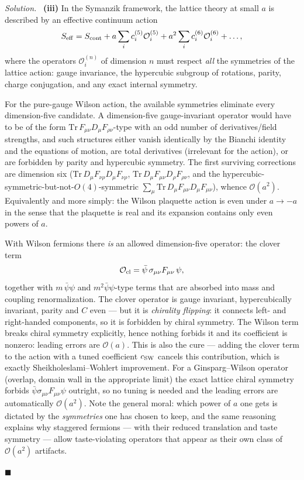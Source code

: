 \documentclass[11pt]{article}
\newenvironment{solution}{\par\smallskip\noindent\textit{Solution.}\ }{\hfill$\blacksquare$\par\smallskip}
\begin{document}
\begin{solution}
\textbf{(iii)} In the Symanzik framework, the lattice theory at small $a$ is described by an effective continuum action
\begin{equation}
S_{\rm eff} = S_{\rm cont} + a\sum_i c_i^{(5)} \mathcal{O}_i^{(5)} + a^2 \sum_i c_i^{(6)} \mathcal{O}_i^{(6)} + \dots,
\end{equation}
where the operators $\mathcal{O}_i^{(n)}$ of dimension $n$ must respect \emph{all} the symmetries of the lattice action: gauge invariance, the hypercubic subgroup of rotations, parity, charge conjugation, and any exact internal symmetry.

For the pure-gauge Wilson action, the available symmetries eliminate every dimension-five candidate. A dimension-five gauge-invariant operator would have to be of the form $\mathrm{Tr}\,F_{\mu\nu}D_\mu F_{\rho\nu}$-type with an odd number of derivatives/field strengths, and such structures either vanish identically by the Bianchi identity and the equations of motion, are total derivatives (irrelevant for the action), or are forbidden by parity and hypercubic symmetry. The first surviving corrections are dimension six ($\mathrm{Tr}\,D_\mu F_{\nu\rho}D_\mu F_{\nu\rho}$, $\mathrm{Tr}\,D_\mu F_{\mu\nu}D_\rho F_{\rho\nu}$, and the hypercubic-symmetric-but-not-$O(4)$-symmetric $\sum_\mu \mathrm{Tr}\,D_\mu F_{\mu\nu}D_\mu F_{\mu\nu}$), whence $\mathcal{O}(a^2)$. Equivalently and more simply: the Wilson plaquette action is even under $a \to -a$ in the sense that the plaquette is real and its expansion contains only even powers of $a$.

With Wilson fermions there \emph{is} an allowed dimension-five operator: the clover term
\begin{equation}
\mathcal{O}_{\rm cl} = \bar\psi\,\sigma_{\mu\nu}F_{\mu\nu}\,\psi ,
\end{equation}
together with $m\,\bar\psi\psi$ and $m^2\bar\psi\psi$-type terms that are absorbed into mass and coupling renormalization. The clover operator is gauge invariant, hypercubically invariant, parity and $C$ even --- but it is \emph{chirality flipping}: it connects left- and right-handed components, so it is forbidden by chiral symmetry. The Wilson term breaks chiral symmetry explicitly, hence nothing forbids it and its coefficient is nonzero: leading errors are $\mathcal{O}(a)$. This is also the cure --- adding the clover term to the action with a tuned coefficient $c_{\rm SW}$ cancels this contribution, which is exactly Sheikholeslami--Wohlert improvement. For a Ginsparg--Wilson operator (overlap, domain wall in the appropriate limit) the exact lattice chiral symmetry forbids $\bar\psi\sigma_{\mu\nu}F_{\mu\nu}\psi$ outright, so no tuning is needed and the leading errors are automatically $\mathcal{O}(a^2)$. Note the general moral: which power of $a$ one gets is dictated by the \emph{symmetries} one has chosen to keep, and the same reasoning explains why staggered fermions --- with their reduced translation and taste symmetry --- allow taste-violating operators that appear as their own class of $\mathcal{O}(a^2)$ artifacts.


\end{solution}
\end{document}
